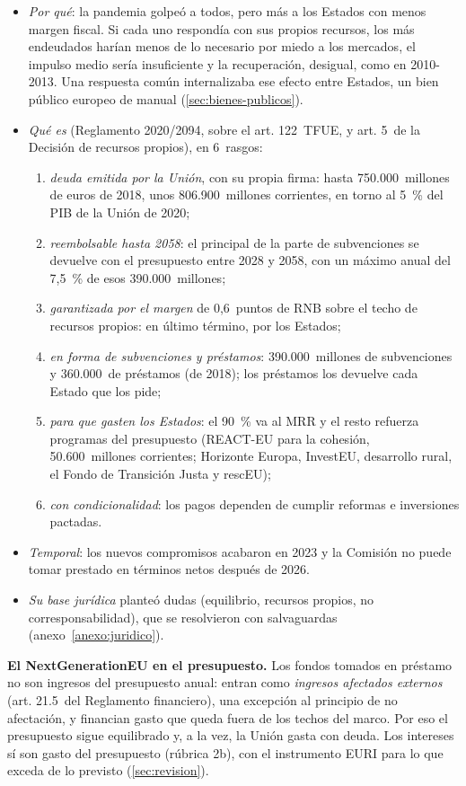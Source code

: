 \documentclass[11pt]{article}
\begin{document}
\begin{itemize}
\item \emph{Por qué}: la pandemia golpeó a todos, pero más a los Estados con menos margen fiscal. Si cada uno respondía con sus propios recursos, los más endeudados harían menos de lo necesario por miedo a los mercados, el impulso medio sería insuficiente y la recuperación, desigual, como en 2010-2013. Una respuesta común internalizaba ese efecto entre Estados, un bien público europeo de manual (\ref{sec:bienes-publicos}).
\item \emph{Qué es} (Reglamento 2020/2094, sobre el art. 122~TFUE, y art. 5~de la Decisión de recursos propios), en 6~rasgos:
  \begin{enumerate}
  \item \emph{deuda emitida por la Unión}, con su propia firma: hasta 750.000~millones de euros de 2018, unos 806.900~millones corrientes, en torno al 5~\% del PIB de la Unión de 2020;
  \item \emph{reembolsable hasta 2058}: el principal de la parte de subvenciones se devuelve con el presupuesto entre 2028 y 2058, con un máximo anual del 7,5~\% de esos 390.000~millones;
  \item \emph{garantizada por el margen} de 0,6~puntos de RNB sobre el techo de recursos propios: en último término, por los Estados;
  \item \emph{en forma de subvenciones y préstamos}: 390.000~millones de subvenciones y 360.000~de préstamos (de 2018); los préstamos los devuelve cada Estado que los pide;
  \item \emph{para que gasten los Estados}: el 90~\% va al MRR y el resto refuerza programas del presupuesto (REACT-EU para la cohesión, 50.600~millones corrientes; Horizonte Europa, InvestEU, desarrollo rural, el Fondo de Transición Justa y rescEU);
  \item \emph{con condicionalidad}: los pagos dependen de cumplir reformas e inversiones pactadas.
  \end{enumerate}
\item \emph{Temporal}: los nuevos compromisos acabaron en 2023 y la Comisión no puede tomar prestado en términos netos después de 2026.
\item \emph{Su base jurídica} planteó dudas (equilibrio, recursos propios, no corresponsabilidad), que se resolvieron con salvaguardas (anexo~\ref{anexo:juridico}).
\end{itemize}

\begin{anotaciones}
\textbf{El NextGenerationEU en el presupuesto.} Los fondos tomados en préstamo no son ingresos del presupuesto anual: entran como \emph{ingresos afectados externos} (art. 21.5~del Reglamento financiero), una excepción al principio de no afectación, y financian gasto que queda fuera de los techos del marco. Por eso el presupuesto sigue equilibrado y, a la vez, la Unión gasta con deuda. Los intereses sí son gasto del presupuesto (rúbrica 2b), con el instrumento EURI para lo que exceda de lo previsto (\ref{sec:revision}).
\end{anotaciones}
\end{document}
